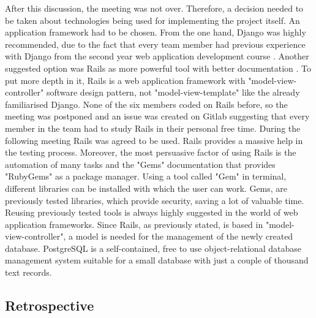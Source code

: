 \documentclass{l3proj}
\begin{document}
After this discussion, the meeting was not over. Therefore, a decision needed to be taken about technologies being used for implementing the project itself. An application framework had to be chosen. From the one hand, Django was highly recommended, due to the fact that every team member had previous experience with Django from the second year web application development course \cite{Django}. Another suggested option was Rails as more powerful tool with better documentation \cite{Rails}. \cite{DjangoVsRails} To put more depth in it, Rails is a web application framework with "model-view-controller" software design pattern, not "model-view-template" like the already familiarised Django. None of the six members coded on Rails before, so the meeting was postponed and an issue was created on Gitlab suggesting that every member in the team had to study Rails in their personal free time. During the following meeting Rails was agreed to be used. Rails provides a massive help in the testing process. \cite{RubyGem} Moreover, the most persuasive factor of using Rails is the automation of many tasks and the "Gems" documentation that provides "RubyGems" as a package manager. Using a tool called "Gem" in  terminal, different libraries can be installed with which the user can work. Gems, are previously tested libraries, which provide security, saving a lot of valuable time. Reusing previously tested tools is always highly suggested in the world of web application frameworks. Since Rails, as previously stated, is based in "model-view-controller", a model is needed for the management of the newly created database.\cite{PostgreSQL} PostgreSQL is a self-contained, free to use object-relational database management system suitable for a small database with just a couple of thousand text records.
\subsection{Retrospective}
\label{retrospective}
\end{document}
